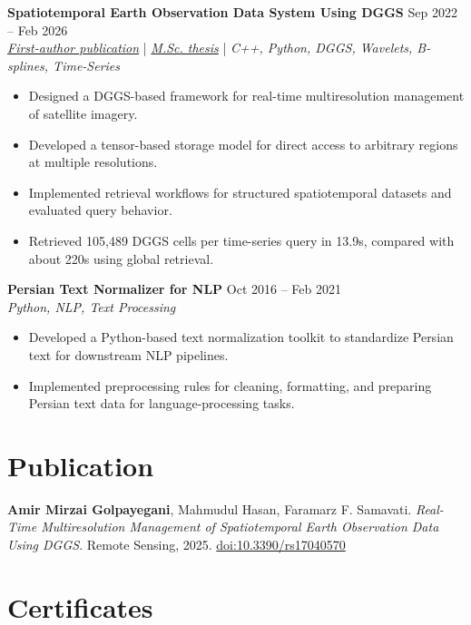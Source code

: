 \documentclass[a4paper,10pt]{article}
\begin{document}
\noindent
\textbf{Spatiotemporal Earth Observation Data System Using DGGS} \hfill Sep 2022 -- Feb 2026 \\
\textit{\href{https://doi.org/10.3390/rs17040570}{First-author publication}} | \textit{\href{https://ucalgary.scholaris.ca/items/114b394b-e516-4732-bd3a-45dd6160d480}{M.Sc. thesis}} | \textit{C++, Python, DGGS, Wavelets, B-splines, Time-Series}
\begin{itemize}[leftmargin=0.25in]
    \item Designed a DGGS-based framework for real-time multiresolution management of satellite imagery.
    \item Developed a tensor-based storage model for direct access to arbitrary regions at multiple resolutions.
    \item Implemented retrieval workflows for structured spatiotemporal datasets and evaluated query behavior.
    \item Retrieved 105,489 DGGS cells per time-series query in 13.9s, compared with about 220s using global retrieval.
\end{itemize}

\noindent
\textbf{Persian Text Normalizer for NLP} \hfill Oct 2016 -- Feb 2021 \\
\textit{Python, NLP, Text Processing}
\begin{itemize}[leftmargin=0.25in]
    \item Developed a Python-based text normalization toolkit to standardize Persian text for downstream NLP pipelines.
    \item Implemented preprocessing rules for cleaning, formatting, and preparing Persian text data for language-processing tasks.
\end{itemize}

\section*{Publication}

\textbf{Amir Mirzai Golpayegani}, Mahmudul Hasan, Faramarz F. Samavati.
\textit{Real-Time Multiresolution Management of Spatiotemporal Earth Observation Data Using DGGS}.
Remote Sensing, 2025. \href{https://doi.org/10.3390/rs17040570}{doi:10.3390/rs17040570}


\section*{Certificates}
\end{document}
